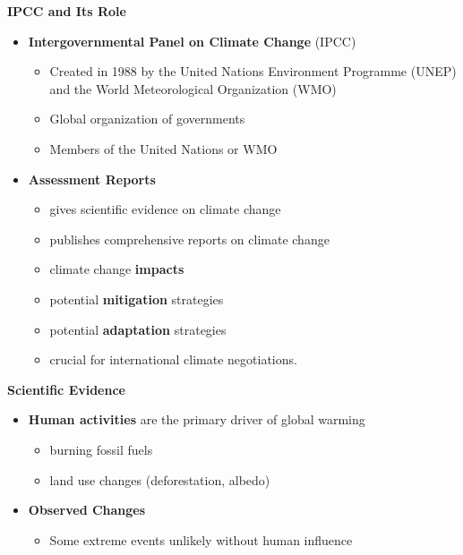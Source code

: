 \documentclass[fontsize=8pt, a4paper, landscape, fleqn]{scrartcl}
\renewcommand{\subsection}[1]{%
    \noindent\colorbox{subsectioncolor}{%
        \parbox{\dimexpr\columnwidth-2\fboxsep}{\color{white}\textbf{#1}}}%
    \vspace{0.5mm}%
}
\begin{document}
\begin{multicols*}{3}[\raggedcolumns]
\subsection{IPCC and Its Role}
\begin{itemize}
    \item \textbf{Intergovernmental Panel on Climate Change} (IPCC)
        \begin{itemize}
            \item Created in 1988 by the United Nations Environment Programme (UNEP) and the World Meteorological Organization (WMO)
            \item Global organization of governments
            \item Members of the United Nations or WMO
        \end{itemize}
    \item \textbf{Assessment Reports}
        \begin{itemize}
            \item gives scientific evidence on climate change
            \item publishes comprehensive reports on climate change
            \item climate change \textbf{impacts}
            \item potential \textbf{mitigation} strategies
            \item potential \textbf{adaptation} strategies
            \item crucial for international climate negotiations.
        \end{itemize}
\end{itemize}

\subsection{Scientific Evidence}
\begin{itemize}
    \item \textbf{Human activities} are the primary driver of global warming
        \begin{itemize}
            \item burning fossil fuels
            \item land use changes (deforestation, albedo)
        \end{itemize}
    \item \textbf{Observed Changes}
        \begin{itemize}
            \item Some extreme events unlikely without human influence
        \end{itemize}
\end{itemize}


\end{multicols*}
\end{document}
